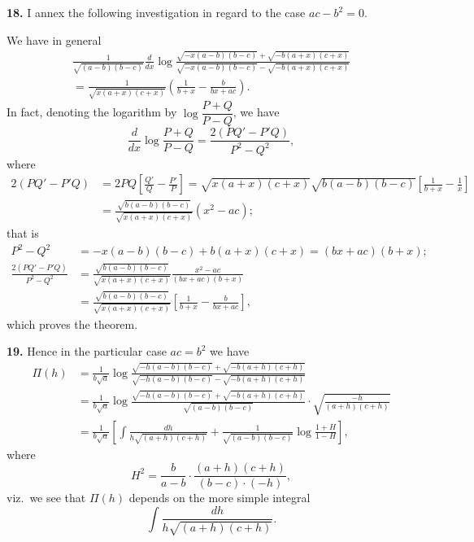 \documentclass[11pt,a4paper]{article}
\begin{document}
\noindent\textbf{18.} I annex the following investigation in regard to the case $ac - b^{2} = 0$.

We have in general
\begin{align*}
\frac{1}{\sqrt{(a-b)(b-c)}} \frac{d}{dx} \log \frac{\sqrt{-x(a-b)(b-c)} + \sqrt{-b(a+x)(c+x)}}{\sqrt{-x(a-b)(b-c)} - \sqrt{-b(a+x)(c+x)}} \\
= \frac{1}{\sqrt{x(a+x)(c+x)}} \left( \frac{1}{b+x} - \frac{b}{bx+ac} \right).
\end{align*}
In fact, denoting the logarithm by $\log \dfrac{P+Q}{P-Q}$, we have
\[
\frac{d}{dx} \log \frac{P+Q}{P-Q} = \frac{2(PQ' - P'Q)}{P^{2}-Q^{2}},
\]
where
\begin{align*}
2(PQ' - P'Q) &= 2PQ \left[ \frac{Q'}{Q} - \frac{P'}{P} \right] = \sqrt{x(a+x)(c+x)} \sqrt{b(a-b)(b-c)} \left[ \frac{1}{b+x} - \frac{1}{x} \right] \\
&= \frac{\sqrt{b(a-b)(b-c)}}{\sqrt{x(a+x)(c+x)}} (x^{2} - ac);
\end{align*}
that is
\begin{align*}
P^{2} - Q^{2} &= -x(a-b)(b-c) + b(a+x)(c+x) = (bx+ac)(b+x); \\
\frac{2(PQ'-P'Q)}{P^{2}-Q^{2}} &= \frac{\sqrt{b(a-b)(b-c)}}{\sqrt{x(a+x)(c+x)}} \frac{x^{2}-ac}{(bx+ac)(b+x)} \\
&= \frac{\sqrt{b(a-b)(b-c)}}{\sqrt{x(a+x)(c+x)}} \left[ \frac{1}{b+x} - \frac{b}{bx+ac} \right],
\end{align*}
which proves the theorem.

\noindent\textbf{19.} Hence in the particular case $ac = b^{2}$ we have
\begin{align*}
\Pi(h) &= \frac{1}{b\sqrt{a}} \log \frac{\sqrt{-h(a-b)(b-c)} + \sqrt{-b(a+h)(c+h)}}{\sqrt{-h(a-b)(b-c)} - \sqrt{-b(a+h)(c+h)}} \\
&= \frac{1}{b\sqrt{a}} \log \frac{\sqrt{-h(a-b)(b-c)} + \sqrt{-b(a+h)(c+h)}}{\sqrt{(a-b)(b-c)}} \cdot \sqrt{\frac{-h}{(a+h)(c+h)}} \\
&= \frac{1}{b\sqrt{a}} \left[ \int \frac{dh}{h\sqrt{(a+h)(c+h)}} + \frac{1}{\sqrt{(a-b)(b-c)}} \log \frac{1+H}{1-H} \right],
\end{align*}
where
\[
H^{2} = \frac{b}{a-b} \cdot \frac{(a+h)(c+h)}{(b-c) \cdot (-h)},
\]
viz.\ we see that $\Pi(h)$ depends on the more simple integral
\[
\int \frac{dh}{h\sqrt{(a+h)(c+h)}}.
\]
\end{document}
